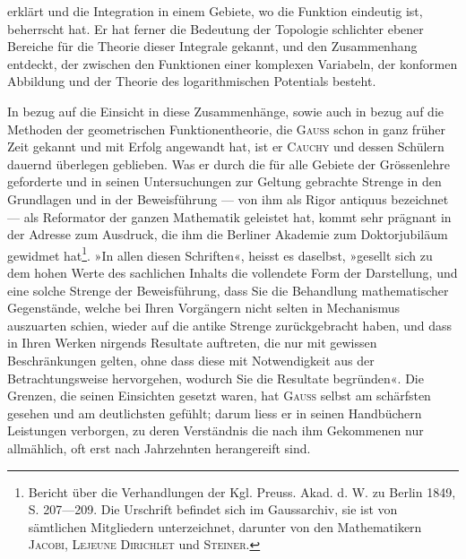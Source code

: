 erklärt und die Integration in einem Gebiete, wo die Funktion eindeutig ist,
beherrscht hat. Er hat ferner die Bedeutung der Topologie schlichter ebener
Bereiche für die Theorie dieser Integrale gekannt, und den Zusammenhang
entdeckt, der zwischen den Funktionen einer komplexen Variabeln, der konformen
Abbildung und der Theorie des logarithmischen Potentials besteht.\par
\clearpage{}
In bezug auf die Einsicht in diese Zusammenhänge, sowie auch in bezug
auf die Methoden der geometrischen Funktionentheorie, die \textsc{Gauss} schon in
ganz früher Zeit gekannt und mit Erfolg angewandt hat, ist er \textsc{Cauchy} und
dessen Schülern dauernd überlegen geblieben. Was er durch die für alle
Gebiete der Grössenlehre geforderte und in seinen Untersuchungen zur Geltung
gebrachte Strenge in den Grundlagen und in der Beweisführung — von
ihm als Rigor antiquus bezeichnet — als Reformator der ganzen Mathematik
geleistet hat, kommt sehr prägnant in der Adresse zum Ausdruck, die ihm
die Berliner Akademie zum Doktorjubiläum gewidmet hat\footnote{Bericht über die Verhandlungen der Kgl. Preuss. Akad. d. W. zu Berlin 1849, S. 207—209. Die Urschrift befindet sich im Gaussarchiv, sie ist von sämtlichen Mitgliedern unterzeichnet, darunter von den Mathematikern \textsc{Jacobi}, \textsc{Lejeune Dirichlet} und \textsc{Steiner}.}. »In allen diesen
Schriften«, heisst es daselbst, »gesellt sich zu dem hohen Werte des sachlichen
Inhalts die vollendete Form der Darstellung, und eine solche Strenge der
Beweisführung, dass Sie die Behandlung mathematischer Gegenstände, welche
bei Ihren Vorgängern nicht selten in Mechanismus auszuarten schien, wieder
auf die antike Strenge zurückgebracht haben, und dass in Ihren Werken
nirgends Resultate auftreten, die nur mit gewissen Beschränkungen gelten, ohne
dass diese mit Notwendigkeit aus der Betrachtungsweise hervorgehen, wodurch
Sie die Resultate begründen«. Die Grenzen, die seinen Einsichten gesetzt
waren, hat \textsc{Gauss} selbst am schärfsten gesehen und am deutlichsten gefühlt;
darum liess er in seinen Handbüchern Leistungen verborgen, zu deren Verständnis
die nach ihm Gekommenen nur allmählich, oft erst nach Jahrzehnten
herangereift sind.
